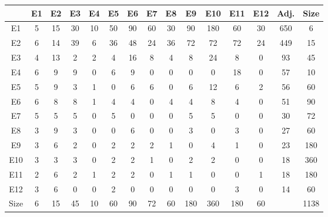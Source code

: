 \documentclass[12pt]{article}
\begin{document}
\begin{center}
\scriptsize
\begin{tabular}{|c|cccccccccccc|c|c|}
\hline
&E1&E2&E3&E4&E5&E6&E7&E8&E9&E10&E11&E12&Adj.&Size\\
\hline
E1& 5& 15& 30& 10& 50& 90& 60& 30& 90& 180& 60& 30&650&6\\
E2& 6& 14& 39& 6& 36& 48& 24& 36& 72& 72& 72& 24&449&15\\
E3& 4& 13& 2& 2& 4& 16& 8& 4& 8& 24& 8& 0&93&45\\
E4& 6& 9& 9& 0& 6& 9& 0& 0& 0& 0& 18& 0&57&10\\
E5& 5& 9& 3& 1& 0& 6& 6& 0& 6& 12& 6& 2&56&60\\
E6& 6& 8& 8& 1& 4& 4& 0& 4& 4& 8& 4& 0&51&90\\
E7& 5& 5& 5& 0& 5& 0& 0& 0& 5& 5& 0& 0&30&72\\
E8& 3& 9& 3& 0& 0& 6& 0& 0& 3& 0& 3& 0&27&60\\
E9& 3& 6& 2& 0& 2& 2& 2& 1& 0& 4& 1& 0&23&180\\
E10& 3& 3& 3& 0& 2& 2& 1& 0& 2& 2& 0& 0&18&360\\
E11& 2& 6& 2& 1& 2& 2& 0& 1& 1& 0& 0& 1&18&180\\
E12& 3& 6& 0& 0& 2& 0& 0& 0& 0& 0& 3& 0&14&60\\
\hline
Size&6&15&45&10&60&90&72&60&180&360&180&60&&1138\\
\hline
\end{tabular}
\end{center}
\end{document}
